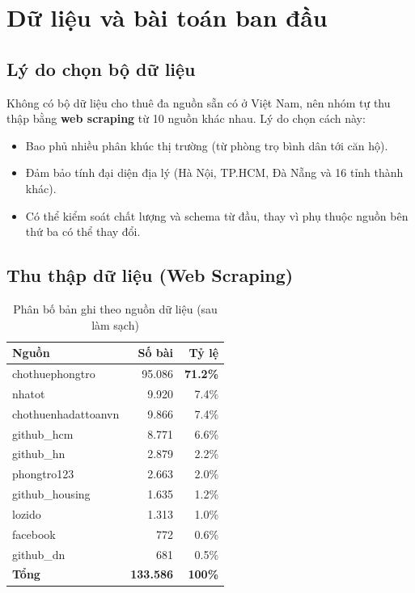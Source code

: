 \section{Dữ liệu và bài toán ban đầu}
\label{sec:data}

\subsection{Lý do chọn bộ dữ liệu}

Không có bộ dữ liệu cho thuê đa nguồn sẵn có ở Việt Nam,
nên nhóm tự thu thập bằng \textbf{web scraping} từ 10 nguồn khác nhau.
Lý do chọn cách này:
\begin{itemize}[leftmargin=*, itemsep=2pt]
  \item Bao phủ nhiều phân khúc thị trường (từ phòng trọ bình dân tới căn hộ).
  \item Đảm bảo tính đại diện địa lý (Hà Nội, TP.HCM, Đà Nẵng và 16 tỉnh thành khác).
  \item Có thể kiểm soát chất lượng và schema từ đầu, thay vì phụ thuộc nguồn
        bên thứ ba có thể thay đổi.
\end{itemize}

\subsection{Thu thập dữ liệu (Web Scraping)}
\label{subsec:collection}

\begin{table}[H]
  \centering
  \caption{Phân bố bản ghi theo nguồn dữ liệu (sau làm sạch)}
  \label{tab:sources}
  \begin{tabular}{@{}lrr@{}}
    \toprule
    \textbf{Nguồn} & \textbf{Số bài} & \textbf{Tỷ lệ} \\
    \midrule
    chothuephongtro     & 95.086 & \textbf{71.2\%} \\
    nhatot              &  9.920 & 7.4\% \\
    chothuenhadattoanvn &  9.866 & 7.4\% \\
    github\_hcm         &  8.771 & 6.6\% \\
    github\_hn          &  2.879 & 2.2\% \\
    phongtro123         &  2.663 & 2.0\% \\
    github\_housing     &  1.635 & 1.2\% \\
    lozido              &  1.313 & 1.0\% \\
    facebook            &    772 & 0.6\% \\
    github\_dn          &    681 & 0.5\% \\
    \midrule
    \textbf{Tổng} & \textbf{133.586} & \textbf{100\%} \\
    \bottomrule
  \end{tabular}
\end{table}

